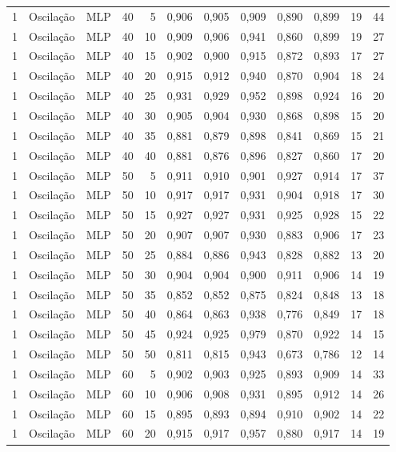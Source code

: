 \begin{longtable}{@{}rllrrrrrrrrr@{}}
1 & Oscilação & MLP & 40 & 5 & 0,906 & 0,905 & 0,909 & 0,890 & 0,899 & 19 & 44 \\
1 & Oscilação & MLP & 40 & 10 & 0,909 & 0,906 & 0,941 & 0,860 & 0,899 & 19 & 27 \\
1 & Oscilação & MLP & 40 & 15 & 0,902 & 0,900 & 0,915 & 0,872 & 0,893 & 17 & 27 \\
1 & Oscilação & MLP & 40 & 20 & 0,915 & 0,912 & 0,940 & 0,870 & 0,904 & 18 & 24 \\
1 & Oscilação & MLP & 40 & 25 & 0,931 & 0,929 & 0,952 & 0,898 & 0,924 & 16 & 20 \\
1 & Oscilação & MLP & 40 & 30 & 0,905 & 0,904 & 0,930 & 0,868 & 0,898 & 15 & 20 \\
1 & Oscilação & MLP & 40 & 35 & 0,881 & 0,879 & 0,898 & 0,841 & 0,869 & 15 & 21 \\
1 & Oscilação & MLP & 40 & 40 & 0,881 & 0,876 & 0,896 & 0,827 & 0,860 & 17 & 20 \\
1 & Oscilação & MLP & 50 & 5 & 0,911 & 0,910 & 0,901 & 0,927 & 0,914 & 17 & 37 \\
1 & Oscilação & MLP & 50 & 10 & 0,917 & 0,917 & 0,931 & 0,904 & 0,918 & 17 & 30 \\
1 & Oscilação & MLP & 50 & 15 & 0,927 & 0,927 & 0,931 & 0,925 & 0,928 & 15 & 22 \\
1 & Oscilação & MLP & 50 & 20 & 0,907 & 0,907 & 0,930 & 0,883 & 0,906 & 17 & 23 \\
1 & Oscilação & MLP & 50 & 25 & 0,884 & 0,886 & 0,943 & 0,828 & 0,882 & 13 & 20 \\
1 & Oscilação & MLP & 50 & 30 & 0,904 & 0,904 & 0,900 & 0,911 & 0,906 & 14 & 19 \\
1 & Oscilação & MLP & 50 & 35 & 0,852 & 0,852 & 0,875 & 0,824 & 0,848 & 13 & 18 \\
1 & Oscilação & MLP & 50 & 40 & 0,864 & 0,863 & 0,938 & 0,776 & 0,849 & 17 & 18 \\
1 & Oscilação & MLP & 50 & 45 & 0,924 & 0,925 & 0,979 & 0,870 & 0,922 & 14 & 15 \\
1 & Oscilação & MLP & 50 & 50 & 0,811 & 0,815 & 0,943 & 0,673 & 0,786 & 12 & 14 \\
1 & Oscilação & MLP & 60 & 5 & 0,902 & 0,903 & 0,925 & 0,893 & 0,909 & 14 & 33 \\
1 & Oscilação & MLP & 60 & 10 & 0,906 & 0,908 & 0,931 & 0,895 & 0,912 & 14 & 26 \\
1 & Oscilação & MLP & 60 & 15 & 0,895 & 0,893 & 0,894 & 0,910 & 0,902 & 14 & 22 \\
1 & Oscilação & MLP & 60 & 20 & 0,915 & 0,917 & 0,957 & 0,880 & 0,917 & 14 & 19 \\

\end{longtable}
